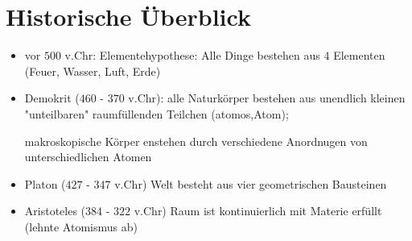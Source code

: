\section{Historische Überblick} %
\label{sec:Historische_Überblick}
\begin{itemize}
    \item vor $500$ v.Chr: Elementehypothese: Alle Dinge bestehen aus $4$
    Elementen (Feuer, Wasser, Luft, Erde)
    \item Demokrit ($460$ - $370$ v.Chr): alle Naturkörper bestehen aus
    unendlich kleinen "unteilbaren" raumfüllenden Teilchen (atomos,Atom);

    makroskopische Körper enstehen durch verschiedene Anordnugen von
    unterschiedlichen Atomen
    \item Platon ($427$ - $347$ v.Chr)
    Welt besteht aus vier geometrischen Bausteinen
    \item Aristoteles ($384$ - $322$ v.Chr)
    Raum ist kontinuierlich mit Materie erfüllt (lehnte Atomismus ab)
\end{itemize}

